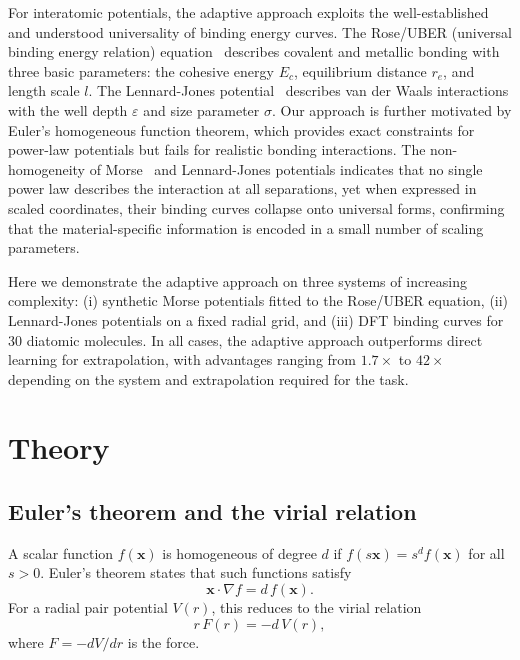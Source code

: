 \documentclass[aps,prb,twocolumn,superscriptaddress,longbibliography,floatfix]{revtex4-2}
\begin{document}
For interatomic potentials, the adaptive approach exploits the well-established and understood universality of binding energy curves. The Rose/UBER (universal binding energy relation) equation~\cite{Rose1984,Ferrante1983} describes covalent and metallic bonding with three basic parameters: the cohesive energy $E_c$, equilibrium distance $r_e$, and length scale $l$. The Lennard-Jones potential~\cite{LennardJones1924} describes van der Waals interactions with the well depth $\varepsilon$ and size parameter $\sigma$. Our approach is further motivated by Euler's homogeneous function theorem, which provides exact constraints for power-law potentials but fails for realistic bonding interactions. The non-homogeneity of Morse~\cite{Morse1929} and Lennard-Jones potentials indicates that no single power law describes the interaction at all separations, yet when expressed in scaled coordinates, their binding curves collapse onto universal forms, confirming that the material-specific information is encoded in a small number of scaling parameters.

Here we demonstrate the adaptive approach on three systems of increasing complexity: (i) synthetic Morse potentials fitted to the Rose/UBER equation, (ii) Lennard-Jones potentials on a fixed radial grid, and (iii) DFT binding curves for 30 diatomic molecules. In all cases, the adaptive approach outperforms direct learning for extrapolation, with advantages ranging from $1.7\times$ to $42\times$ depending on the system and extrapolation required for the task.


\section{Theory}
\label{sec:theory}

\subsection{Euler's theorem and the virial relation}
\label{sec:euler}

A scalar function $f(\mathbf{x})$ is homogeneous of degree $d$ if $f(s\mathbf{x}) = s^d f(\mathbf{x})$ for all $s > 0$. Euler's theorem states that such functions satisfy
\begin{equation}
  \mathbf{x} \cdot \nabla f = d\, f(\mathbf{x}).
  \label{eq:euler}
\end{equation}
For a radial pair potential $V(r)$, this reduces to the virial relation
\begin{equation}
  r\, F(r) = -d\, V(r),
  \label{eq:virial}
\end{equation}
where $F = -dV/dr$ is the force.
\end{document}
